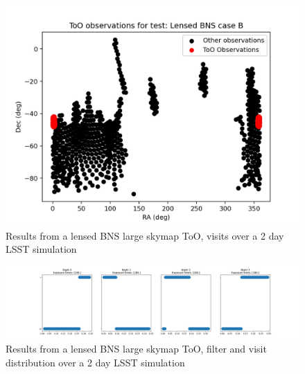 \begin{figure}
    \centering
    \includegraphics[width=\linewidth]{figures/validationTests/SVRequired/LensedBNSBPosition.png}
    \caption{Results from a lensed BNS large skymap ToO, visits over a 2 day LSST simulation}
    \label{fig:LensedBNSBPositionResult}
\end{figure}

\begin{figure}
    \centering
    \includegraphics[width=\linewidth]{figures/validationTests/SVRequired/LensedBNSBFilterPlot.png}
    \caption{Results from a lensed BNS large skymap ToO, filter and visit distribution over a 2 day LSST simulation}
    \label{fig:LensedBNSBFilterResult}
\end{figure}
\newpage